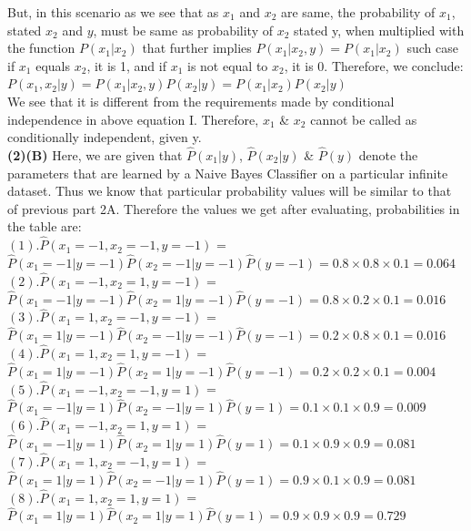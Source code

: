 \documentclass[11pt]{article}
\renewcommand\part[1]{\vspace{.10in}\textbf{(#1)}}
\begin{document}
But, in this scenario as we see that as $x_1$ and $x_2$ are same, the probability of $x_1$, stated $x_2$ and $y$, must be same as probability of $x_2$ stated y, when multiplied with the function $P(x_1 | x_2)$ that further implies $P(x_1 | x_2,y) = P(x_1 | x_2)$ such case if $x_1$ equals $x_2$, it is 1, and if $x_1$ is not equal to $x_2$, it is 0. Therefore, we conclude:\\
$P(x_1,x_2 | y) = P(x_1 | x_2,y) P(x_2 | y) = P(x_1 | x_2) P(x_2|y)$\\

We see that it is different from the requirements made by conditional independence in above equation I.
Therefore, $x_1$ \& $x_2$ cannot be called as conditionally independent, given y.\\


\part{2}\textbf{(B)} Here, we are given that $\hat{P}(x_1 | y)$, $\hat{P}(x_2 | y)$ \& $\hat{P}(y)$ denote the parameters that are learned by a Naive Bayes Classifier on a particular infinite dataset. Thus we know that particular probability values will be similar to that of previous part 2A. Therefore the values we get after evaluating, probabilities in the table are:\\
	$(1) . \hat{P}(x_1 = -1,x_2 = -1,y = -1 )$ = $\hat{P}(x_1= -1| y=-1 )\hat{P}(x_2= -1| y= -1)\hat{P}(y= -1) = 0.8\times 0.8 \times 0.1 = 0.064$ \newline
	$(2) . \hat{P}(x_1 =-1 ,x_2 =1 ,y = -1 )$ = $\hat{P}(x_1=-1 | y=-1 )\hat{P}(x_2=1 | y= -1)\hat{P}(y= -1) = 0.8 \times 0.2 \times 0.1 = 0.016$ \newline
	$(3) . \hat{P}(x_1 = 1,x_2 =-1 ,y = -1 )$ = $\hat{P}(x_1=1 | y=-1 )\hat{P}(x_2=-1 | y= -1)\hat{P}(y= -1) = 0.2\times 0.8 \times 0.1 = 0.016$ \newline
	$(4) . \hat{P}(x_1 =1 ,x_2 =1 ,y = -1 )$ = $\hat{P}(x_1=1 | y=-1 )\hat{P}(x_2= 1| y= -1)\hat{P}(y= -1) = 0.2 \times 0.2 \times 0.1 = 0.004$ \newline
	$(5) . \hat{P}(x_1 = -1,x_2 = -1,y = 1 )$ = $\hat{P}(x_1= -1| y=1 )\hat{P}(x_2= -1| y= 1)\hat{P}(y= 1) = 0.1\times 0.1 \times 0.9 = 0.009$ \newline
	$(6) . \hat{P}(x_1 =-1 ,x_2 =1 ,y = 1 )$ = $\hat{P}(x_1=-1 | y=1 )\hat{P}(x_2=1 | y= 1)\hat{P}(y= 1) = 0.1 \times 0.9 \times 0.9 = 0.081$ \newline
	$(7) . \hat{P}(x_1 = 1,x_2 =-1 ,y = 1 )$ = $\hat{P}(x_1=1 | y=1 )\hat{P}(x_2=-1 | y= 1)\hat{P}(y= 1) = 0.9\times 0.1 \times 0.9 = 0.081$ \newline
	$(8) . \hat{P}(x_1 =1 ,x_2 =1 ,y = 1 )$ =\\ $\hat{P}(x_1=1 | y=1 )\hat{P}(x_2= 1| y= 1)\hat{P}(y= 1) = 0.9 \times 0.9 \times 0.9 = 0.729$ \newline
\end{document}
